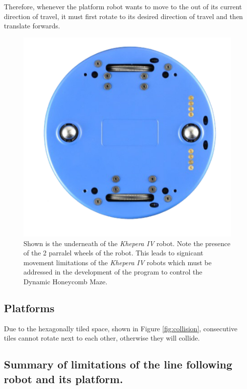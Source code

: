 Therefore, whenever the platform robot wants to move to the out of its current direction of travel, it must first rotate to its desired direction of travel and then translate forwards.

\begin{figure}[h]
    \centering
    \includegraphics[scale = 0.5]{images/khepera_IV_robot.png}
    \caption{Shown is the underneath of the \textit{Khepera IV} robot. Note the presence of the 2 parralel wheels of the robot. This leads to signicant movement limitations of the \textit{Khepera IV} robots which must be addressed in the development of the program to control the Dynamic Honeycomb Maze.}
    \label{fig:robot}
\end{figure}

\subsection{Platforms}

Due to the hexagonally tiled space, shown in Figure \ref{fig:collision}, consecutive tiles cannot rotate next to each other, otherwise they will collide.

\subsection{Summary of limitations of the line following robot and its platform.} 

